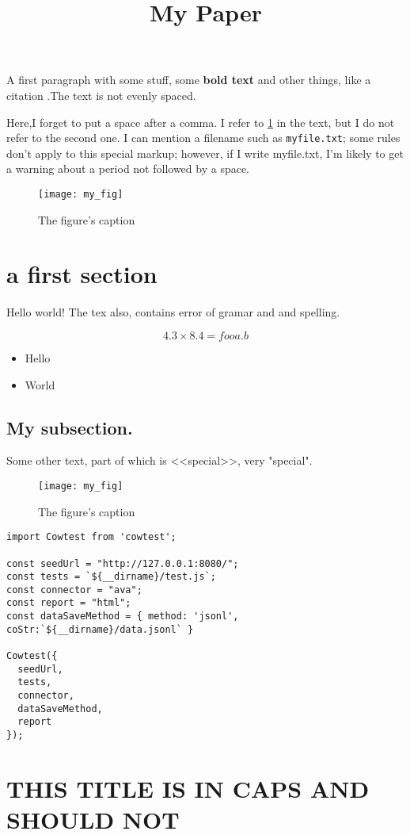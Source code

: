 \documentclass{article}
\begin{document}
\title{My Paper}
\maketitle

A first paragraph with some stuff, some \textbf{bold text}   and other things, like a citation\cite{my:paper} .The text is  not evenly spaced.

Here,I forget to put a space after a comma. I refer to \ref{fig:thisfig1} in the text, but I do not refer to the second one. I can mention a filename such as \verb+myfile.txt+; some rules don't apply to this special markup; however, if I write myfile.txt, I'm likely to get a warning about a period not followed by a space.

\begin{figure}
\texttt{[image: my\_fig]}
\caption{The figure's caption}
\label{fig:thisfig1}
\end{figure}

\section{a first section}

Hello world! The tex also, contains error of gramar and and spelling.

\begin{equation*}
4.3 \times 8.4 = foo a.b
\end{equation*}

\begin{itemize}
\item Hello %
\item   World
\end{itemize}

\subsection{ My subsection. }

Some other text, part of which is <<special>>, very "special".

\begin{figure}
\texttt{[image: my\_fig]}
\caption{The figure's caption}
\label{fig:thisfig2}
\end{figure}

  \begin{lstlisting}
import Cowtest from 'cowtest';

const seedUrl = "http://127.0.0.1:8080/";
const tests = `${__dirname}/test.js`;
const connector = "ava";
const report = "html";
const dataSaveMethod = { method: 'jsonl', coStr:`${__dirname}/data.jsonl` }

Cowtest({
  seedUrl,
  tests,
  connector,
  dataSaveMethod,
  report
});
  \end{lstlisting}
  
\section{ THIS TITLE IS IN CAPS AND SHOULD NOT}
\end{document}
